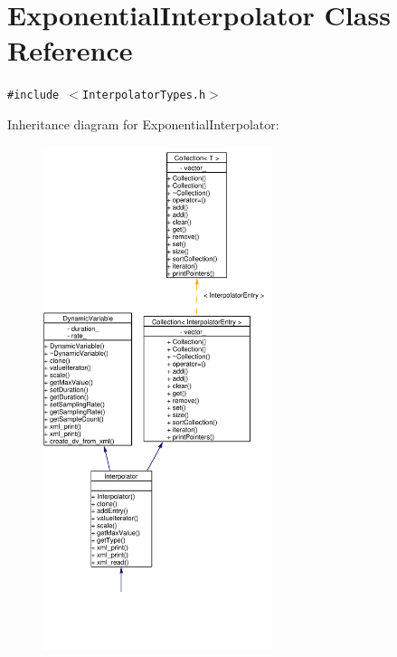 \hypertarget{classExponentialInterpolator}{
\section{Exponential\-Interpolator Class Reference}
\label{classExponentialInterpolator}
}
{\tt \#include $<$Interpolator\-Types.h$>$}

Inheritance diagram for Exponential\-Interpolator:\begin{figure}[H]
\begin{center}
\leavevmode
\includegraphics[width=189pt]{classExponentialInterpolator__inherit__graph}
\end{center}
\end{figure}
